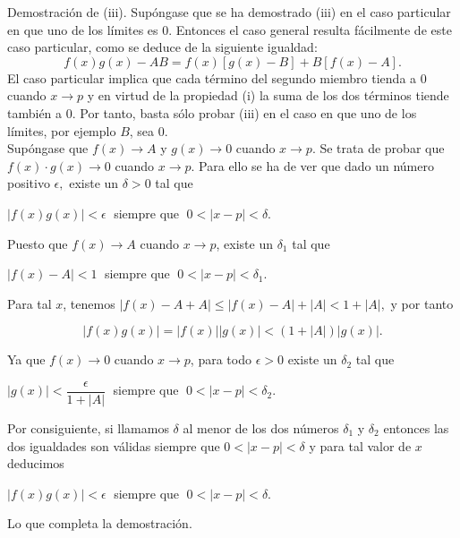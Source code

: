 Demostración de (iii). Supóngase que se ha demostrado (iii) en el caso particular en que uno de los límites es $0$. Entonces el caso general resulta fácilmente de este caso particular, como se deduce de la siguiente igualdad:
$$f(x)g(x)-AB = f(x)[g(x)-B]+B[f(x)-A].$$
El caso particular implica que cada término del segundo miembro tienda a $0$ cuando $x\to p$ y en virtud de la propiedad (i) la suma de los dos términos tiende también a $0$. Por tanto, basta sólo probar (iii) en el caso en que uno de los límites, por ejemplo $B$, sea $0$.\\
Supóngase que $f(x)\to A$ y $g(x)\to 0$ cuando $x\to p$. Se trata de probar que $f(x)\cdot g(x)\to 0$ cuando $x\to p.$ Para ello se ha de ver que dado un número positivo $\epsilon,$ existe un $\delta>0$ tal que 
\begin{center}
$|f(x)g(x)|<\epsilon\;$ siempre que $\;0<|x-p|<\delta.$
\end{center}

Puesto que $f(x)\to A$ cuando $x\to p$, existe un $\delta_1$ tal que 

\begin{center}
    $|f(x)-A|<1\;$ siempre que $\; 0<|x-p|<\delta_1.$
\end{center}

Para tal $x$, tenemos $|f(x)-A+A|\leq |f(x)-A|+|A|<1+|A|,$ y por tanto

$$|f(x)g(x)|=|f(x)||g(x)|<(1+|A|)|g(x)|.$$

Ya que $f(x)\to 0$ cuando $x\to p$, para todo $\epsilon > 0$ existe un $\delta_2$ tal que 

\begin{center}
$|g(x)|<\dfrac{\epsilon}{1+|A|}\;$ siempre que $\; 0<|x-p|<\delta_2.$
\end{center}

Por consiguiente, si llamamos $\delta$ al menor de los dos números $\delta_1$ y $\delta_2$ entonces las dos igualdades son válidas siempre que $0<|x-p|<\delta$ y para tal valor de $x$ deducimos 

\begin{center}
$|f(x)g(x)|<\epsilon\;$ siempre que $\;0<|x-p|<\delta.$
\end{center}

Lo que completa la demostración.\\\\

